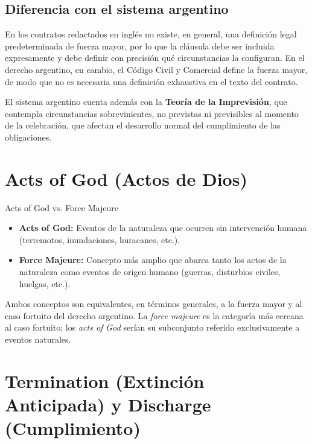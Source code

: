 \documentclass[12pt,oneside]{book}
\begin{document}
\subsection{Diferencia con el sistema argentino}

En los contratos redactados en inglés no existe, en general, una
definición legal predeterminada de fuerza mayor, por lo que la cláusula
debe ser incluida expresamente y debe definir con precisión qué
circunstancias la configuran. En el derecho argentino, en cambio, el
Código Civil y Comercial define la fuerza mayor, de modo que no es
necesaria una definición exhaustiva en el texto del contrato.

El sistema argentino cuenta además con la \textbf{Teoría de la
Imprevisión}, que contempla circunstancias sobrevinientes, no previstas ni
previsibles al momento de la celebración, que afectan el desarrollo normal
del cumplimiento de las obligaciones.

\section{Acts of God (Actos de Dios)}

\begin{definition}{Acts of God vs. Force Majeure}
\begin{itemize}
    \item \textbf{Acts of God:} Eventos de la naturaleza que ocurren sin
    intervención humana (terremotos, inundaciones, huracanes, etc.).
    \item \textbf{Force Majeure:} Concepto más amplio que abarca tanto los
    actos de la naturaleza como eventos de origen humano (guerras, disturbios
    civiles, huelgas, etc.).
\end{itemize}
Ambos conceptos son equivalentes, en términos generales, a la fuerza mayor
y al caso fortuito del derecho argentino. La \textit{force majeure} es la
categoría más cercana al caso fortuito; los \textit{acts of God} serían su
subconjunto referido exclusivamente a eventos naturales.
\end{definition}

\section{Termination (Extinción Anticipada) y Discharge (Cumplimiento)}
\end{document}
